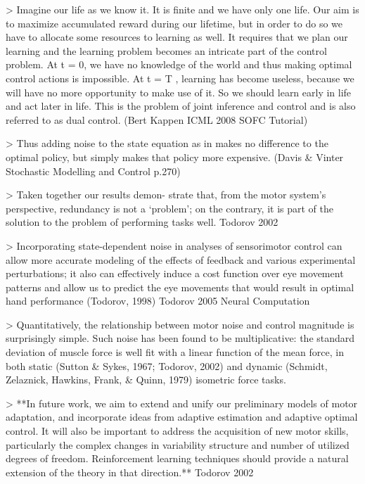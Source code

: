 \documentclass[../main.tex]{subfiles}
\begin{document}
{{> Imagine our life as we know it. It is finite and we have only one life. Our aim is to maximize accumulated reward during our lifetime, but in order to do so we have to allocate some resources to learning as well. It requires that we plan our learning and the learning problem becomes an intricate part of the control problem. At t = 0, we have no knowledge of the world and thus making optimal control actions is impossible. At t = T , learning has become useless, because we will have no more opportunity to make use of it. So we should learn early in life and act later in life. This is the problem of joint inference and control and is also referred to as dual control. (Bert Kappen ICML 2008 SOFC Tutorial)



> Thus adding noise to the state equation as in makes no difference to the optimal policy, but simply makes that policy more expensive. (Davis & Vinter Stochastic Modelling and Control p.270)



> Taken together our results demon- strate that, from the motor system’s perspective, redundancy is not a ‘problem’; on the contrary, it is part of the solution to the problem of performing tasks well. Todorov 2002



> Incorporating state-dependent noise in analyses of sensorimotor control can allow more accurate modeling of the effects of feedback and various experimental perturbations; it also can effectively induce a cost function over eye movement patterns and allow us to predict the eye movements that would result in optimal hand performance (Todorov, 1998) Todorov 2005 Neural Computation



> Quantitatively, the relationship between motor noise and control magnitude is surprisingly simple. Such noise has been found to be multiplicative: the standard deviation of muscle force is well fit with a linear function of the mean force, in both static (Sutton & Sykes, 1967; Todorov, 2002) and dynamic (Schmidt, Zelaznick, Hawkins, Frank, & Quinn, 1979) isometric force tasks.



> **In future work, we aim to extend and unify our preliminary models of motor adaptation, and incorporate ideas from adaptive estimation and adaptive optimal control. It will also be important to address the acquisition of new motor skills, particularly the complex changes in variability structure and number of utilized degrees of freedom. Reinforcement learning techniques should provide a natural extension of the theory in that direction.** Todorov 2002



}}
\end{document}
